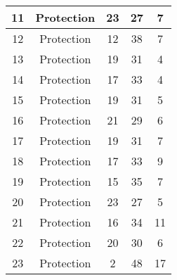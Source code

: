\documentclass[results.tex]{subfiles}
\begin{document}
\begin{center}
\begin{tabular}{| c || c | c | c | c |}
            \hline
            11                      & Protection                   & 23                     & 27                      & 7                    \\
            \hline
            12                      & Protection                   & 12                     & 38                      & 7                    \\
            \hline
            13                      & Protection                   & 19                     & 31                      & 4                    \\
            \hline
            14                      & Protection                   & 17                     & 33                      & 4                    \\
            \hline
            15                      & Protection                   & 19                     & 31                      & 5                    \\
            \hline
            16                      & Protection                   & 21                     & 29                      & 6                    \\
            \hline
            17                      & Protection                   & 19                     & 31                      & 7                    \\
            \hline
            18                      & Protection                   & 17                     & 33                      & 9                    \\
            \hline
            19                      & Protection                   & 15                     & 35                      & 7                    \\
            \hline
            20                      & Protection                   & 23                     & 27                      & 5                    \\
            \hline
            21                      & Protection                   & 16                     & 34                      & 11                   \\
            \hline
            22                      & Protection                   & 20                     & 30                      & 6                    \\
            \hline
            23                      & Protection                   & 2                      & 48                      & 17                   \\

\end{tabular}
\end{center}
\end{document}
